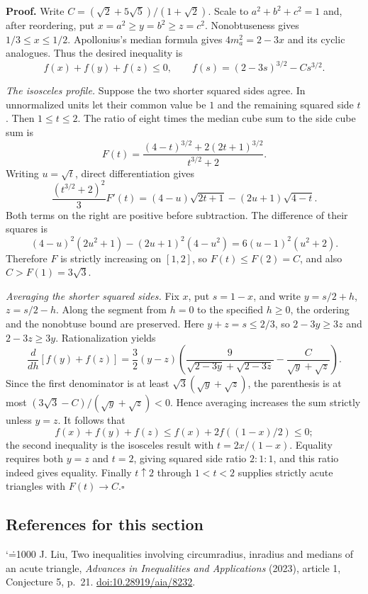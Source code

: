 \documentclass[11pt,a4paper]{article}
\makeatletter
\numberwithin{equation}{section}
\theoremstyle{definition}
\theoremstyle{remark}
\renewenvironment{thebibliography}[1]
 {\subsection*{References for this section}\small
  \list{\@biblabel{\@arabic\c@enumiv}}
       {\settowidth\labelwidth{\@biblabel{#1}}\leftmargin\labelwidth
        \advance\leftmargin\labelsep\@openbib@code
        \usecounter{enumiv}\let\p@enumiv\@empty
        \renewcommand\theenumiv{\@arabic\c@enumiv}}
  \sloppy\clubpenalty4000\widowpenalty4000\sfcode`\.=1000\relax}
 {\def\@noitemerr{\@latex@warning{Empty bibliography}}\endlist}
\makeatother
\begin{document}
\textbf{Proof.} Write $C=(\sqrt2+5\sqrt5)/(1+\sqrt2)$. Scale to $a^2+b^2+c^2=1$ and, after reordering, put $x=a^2\ge y=b^2\ge z=c^2$. Nonobtuseness gives $1/3\le x\le 1/2$. Apollonius's median formula gives $4m_a^2=2-3x$ and its cyclic analogues. Thus the desired inequality is
\[
 f(x)+f(y)+f(z)\le0,\qquad
 f(s)=(2-3s)^{3/2}-Cs^{3/2}.
\]

\emph{The isosceles profile.} Suppose the two shorter squared sides agree. In unnormalized units let their common value be $1$ and the remaining squared side $t$. Then $1\le t\le2$. The ratio of eight times the median cube sum to the side cube sum is
\[
 F(t)=\frac{(4-t)^{3/2}+2(2t+1)^{3/2}}{t^{3/2}+2}.
\]
Writing $u=\sqrt t$, direct differentiation gives
\[
 \frac{(t^{3/2}+2)^2}{3}F'(t)
  =(4-u)\sqrt{2t+1}-(2u+1)\sqrt{4-t}.
\]
Both terms on the right are positive before subtraction. The difference of their squares is
\[
 (4-u)^2(2u^2+1)-(2u+1)^2(4-u^2)
 =6(u-1)^2(u^2+2).
\]
Therefore $F$ is strictly increasing on $[1,2]$, so $F(t)\le F(2)=C$, and also $C>F(1)=3\sqrt3$.

\emph{Averaging the shorter squared sides.} Fix $x$, put $s=1-x$, and write $y=s/2+h$, $z=s/2-h$. Along the segment from $h=0$ to the specified $h\ge0$, the ordering and the nonobtuse bound are preserved. Here $y+z=s\le2/3$, so $2-3y\ge3z$ and $2-3z\ge3y$. Rationalization yields
\[
 \frac{d}{dh}[f(y)+f(z)]=\frac32(y-z)
 \left(\frac{9}{\sqrt{2-3y}+\sqrt{2-3z}}
              -\frac C{\sqrt y+\sqrt z}\right).
\]
Since the first denominator is at least $\sqrt3(\sqrt y+\sqrt z)$, the parenthesis is at most $(3\sqrt3-C)/(\sqrt y+\sqrt z)<0$. Hence averaging increases the sum strictly unless $y=z$. It follows that
\[
 f(x)+f(y)+f(z)\le f(x)+2f((1-x)/2)\le0;
\]
the second inequality is the isosceles result with $t=2x/(1-x)$. Equality requires both $y=z$ and $t=2$, giving squared side ratio $2:1:1$, and this ratio indeed gives equality. Finally $t\uparrow2$ through $1<t<2$ supplies strictly acute triangles with $F(t)\to C$.\hfill$\square$

\begin{thebibliography}{1}
 J. Liu, Two inequalities involving circumradius, inradius and medians of an acute triangle, \emph{Advances in Inequalities and Applications} (2023), article 1, Conjecture 5, p.~21.
\href{https://doi.org/10.28919/aia/8232}{doi:10.28919/aia/8232}.
\end{thebibliography}

\par\endgroup
\end{document}
